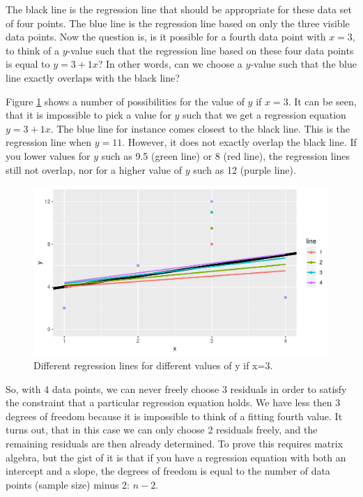 \documentclass[]{report}\usepackage[]{graphicx}\usepackage[]{color}
\makeatletter
\def\maxwidth{ %
  \ifdim\Gin@nat@width>\linewidth
    \linewidth
  \else
    \Gin@nat@width
  \fi
}
\newenvironment{knitrout}{}{} %
\makeatother
\begin{document}
The black line is the regression line that should be appropriate for these data set of four points. The blue line is the regression line based on only the three visible data points. Now the question is, is it possible for a fourth data point with $x=3$, to think of a $y$-value such that the regression line based on these four data points is equal to $y=3+1x$? In other words, can we choose a $y$-value such that the blue line exactly overlaps with the black line?

Figure \ref{fig:inf_13} shows a number of possibilities for the value of $y$ if $x=3$. It can be seen, that it is impossible to pick a value for $y$ such that we get a regression equation $y=3+1x$. The blue line for instance comes closest to the black line. This is the regression line when $y=11$. However, it does not exactly overlap the black line. If you lower values for $y$ such as 9.5 (green line) or 8 (red line), the regression lines still not overlap, nor for a higher value of $y$ such as 12 (purple line).

\begin{knitrout}
\color{fgcolor}\begin{figure}

{\centering \includegraphics[width=\maxwidth]{figure/inf_13-1} 

}

\caption[Different regression lines for different values of y if x=3]{Different regression lines for different values of y if x=3.}\label{fig:inf_13}
\end{figure}


\end{knitrout}

So, with 4 data points, we can never freely choose 3 residuals in order to satisfy the constraint that a particular regression equation holds. We have less then 3 degrees of freedom because it is impossible to think of a fitting fourth value. It turns out, that in this case we can only choose 2 residuals freely, and the remaining residuals are then already determined. To prove this requires matrix algebra, but the gist of it is that if you have a regression equation with both an intercept and a slope, the degrees of freedom is equal to the number of data points (sample size) minus 2: $n-2$.
\end{document}
